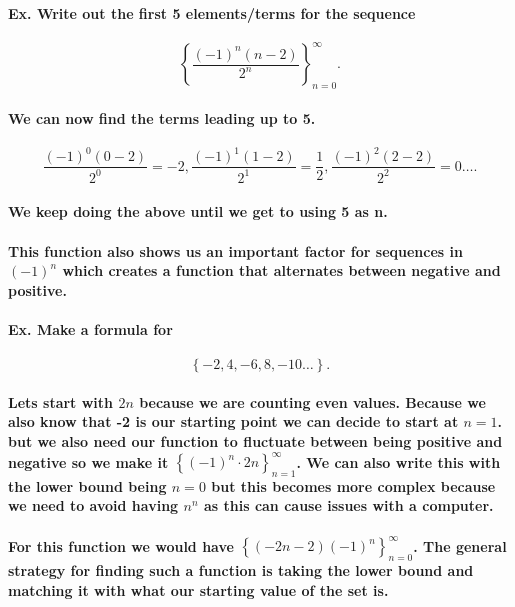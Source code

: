 \paragraph{Ex. Write out the first 5 elements/terms for the sequence}

\[
	\left\{\frac{\left( -1 \right) ^{n}\left( n-2 \right) }{2^{n}}\right\}_{n=0}^{\infty}
.\] 

\paragraph{We can now find the terms leading up to 5.}

\[
\frac{\left( -1 \right) ^{0}\left( 0-2 \right) }{2^{0}}=-2, \frac{\left( -1 \right) ^{1}\left( 1-2 \right) }{2^{1}}=\frac{1}{2}, \frac{\left( -1 \right) ^{2}\left( 2-2 \right) }{2^{2}}=0 \ldots
.\] 
\paragraph{We keep doing the above until we get to using 5 as n.}

\paragraph{This function also shows us an important factor for sequences in $\left( -1 \right) ^{n}$ which creates a function that alternates between negative and positive.}

\newpage
\paragraph{Ex. Make a formula for}
\[
	\left\{-2,4,-6,8,-10 \ldots \right\}
.\] 
\paragraph{Lets start with $2n$ because we are counting even values. Because we also know that -2 is our starting point we can decide to start at $n=1$. but we also need our function to fluctuate between being positive and negative so we make it $\left\{\left( -1 \right) ^{n}\cdot 2n\right\}_{n=1}^{\infty}$. We can also write this with the lower bound being $n=0$ but this becomes more complex because we need to avoid having $n^{n}$ as this can cause issues with a computer. }

\paragraph{For this function we would have $\left\{\left( -2n-2 \right) \left( -1 \right) ^{n}\right\}_{n=0}^{\infty}$. The general strategy for finding such a function is taking the lower bound and matching it with what our starting value of the set is. }

